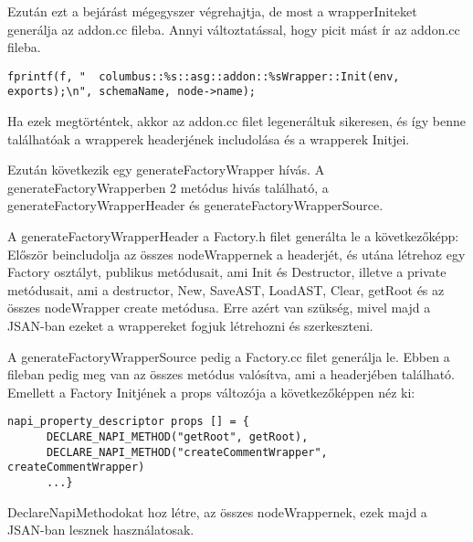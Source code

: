 Ezután ezt a bejárást mégegyszer végrehajtja, de most a wrapperIniteket generálja az addon.cc fileba.
Annyi változtatással, hogy picit mást ír az addon.cc fileba.
\begin{lstlisting}[caption={generateWrapInit leimplementálása}, label={lst:addoncc_wrapper_inits_implementation}, language={CStyle}]
fprintf(f, "  columbus::%s::asg::addon::%sWrapper::Init(env, exports);\n", schemaName, node->name);
\end{lstlisting}

Ha ezek megtörténtek, akkor az addon.cc filet legeneráltuk sikeresen, és így benne találhatóak a wrapperek headerjének includolása és a wrapperek Initjei.

\noindent

Ezután következik egy generateFactoryWrapper hívás.
A generateFactoryWrapperben 2 metódus hivás található, a generateFactoryWrapperHeader és generateFactoryWrapperSource.

\noindent

A generateFactoryWrapperHeader a Factory.h filet generálta le a következőképp:
Először beincludolja az összes nodeWrappernek a headerjét, és utána létrehoz egy Factory osztályt, publikus metódusait, ami Init és Destructor, illetve a private metódusait,
ami a destructor, New, SaveAST, LoadAST, Clear, getRoot és az összes nodeWrapper create metódusa.
Erre azért van szükség, mivel majd a JSAN-ban ezeket a wrappereket fogjuk létrehozni és szerkeszteni.

\noindent

A generateFactoryWrapperSource pedig a Factory.cc filet generálja le.
Ebben a fileban pedig meg van az összes metódus valósítva, ami a headerjében található.
Emellett a Factory Initjének a props változója a következőképpen néz ki:
\begin{lstlisting}[caption={Factory.cc file}, label={factory_cc}, language={CStyle}]
napi_property_descriptor props [] = {
      DECLARE_NAPI_METHOD("getRoot", getRoot),
      DECLARE_NAPI_METHOD("createCommentWrapper", createCommentWrapper)
      ...}
\end{lstlisting}

DeclareNapiMethodokat hoz létre, az összes nodeWrappernek, ezek majd a JSAN-ban lesznek használatosak.

\noindent

